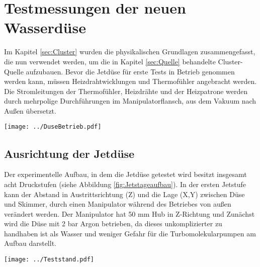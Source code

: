 \section{Testmessungen der neuen Wasserdüse}

Im Kapitel \ref{sec:Cluster} wurden die physikalischen Grundlagen zusammengefasst, die nun verwendet werden, um die in Kapitel \ref{sec:Quelle} behandelte Cluster-Quelle aufzubauen.
Bevor die Jetdüse für erste Tests in Betrieb genommen werden kann, müssen Heizdrahtwicklungen und Thermofühler angebracht werden. Die Stromleitungen der Thermofühler, Heizdrähte und der Heizpatrone werden durch mehrpolige \linebreak Durchführungen im Manipulatorflansch, aus dem Vakuum nach Außen übersetzt. 

\begin{center}
\begin{minipage}{\linewidth}
\centering
\texttt{[image: ../DuseBetrieb.pdf]}%
 \label{fig:DuseBetrieb}
\end{minipage} 
\end{center} 

\subsection{Ausrichtung der Jetdüse} \label{sec:Ausrichtung der Jetduse}

Der experimentelle Aufbau, in dem die Jetdüse getestet wird besitzt insgesamt acht Druckstufen (siehe Abbildung \ref{fig:Jetstageaufbau}). In der ersten Jetstufe kann der Abstand in Austrittsrichtung (Z) und die Lage (X,Y) zwischen Düse und Skimmer, durch einen Manipulator während des Betriebes von außen verändert werden. Der Manipulator hat 50 mm Hub in Z-Richtung und  Zunächst wird die Düse mit 2 bar Argon betrieben, da dieses unkomplizierter zu handhaben ist als Wasser und weniger Gefahr für die Turbomolekularpumpen am Aufbau darstellt. 

\begin{center}
\begin{minipage}{\linewidth}
\centering
\texttt{[image: ../Teststand.pdf]}%
 \label{fig:Teststand2}
\end{minipage} 
\end{center} 


